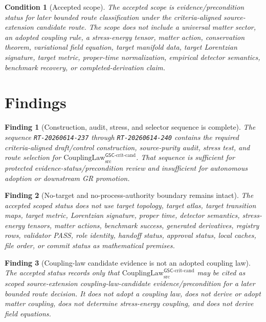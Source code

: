 \documentclass[11pt]{article}
\newcommand{\CouplingLawCrit}{\mathrm{CouplingLaw}^{\mathsf{GSC}\mbox{-}\mathrm{crit}\mbox{-}\mathrm{cand}}_{\mathrm{src}}}
\newtheorem{finding}{Finding}
\newtheorem{condition}{Condition}
\begin{document}
\begin{condition}[Accepted scope]
The accepted scope is evidence/precondition status for later bounded route
classification under the criteria-aligned source-extension candidate route.
The scope does not include a universal matter sector, an adopted coupling
rule, a stress-energy tensor, matter action, conservation theorem,
variational field equation, target manifold data, target Lorentzian
signature, target metric, proper-time normalization, empirical detector
semantics, benchmark recovery, or completed-derivation claim.
\end{condition}

\section{Findings}

\begin{finding}[Construction, audit, stress, and selector sequence is complete]
The sequence \texttt{RT-20260614-237} through \texttt{RT-20260614-240}
contains the required criteria-aligned draft/control construction,
source-purity audit, stress test, and route selection for
\(\CouplingLawCrit\). That sequence is sufficient for protected
evidence-status/precondition review and insufficient for autonomous adoption
or downstream GR promotion.
\end{finding}

\begin{finding}[No-target and no-process-authority boundary remains intact]
The accepted scoped status does not use target topology, target atlas, target
transition maps, target metric, Lorentzian signature, proper time, detector
semantics, stress-energy tensors, matter actions, benchmark success,
generated derivatives, registry rows, validator PASS, role identity, handoff
status, approval status, local caches, file order, or commit status as
mathematical premises.
\end{finding}

\begin{finding}[Coupling-law candidate evidence is not an adopted coupling law]
The accepted status records only that \(\CouplingLawCrit\) may be cited as
scoped source-extension coupling-law-candidate evidence/precondition for a
later bounded route decision. It does not adopt a coupling law, does not
derive or adopt matter coupling, does not determine stress-energy coupling,
and does not derive field equations.
\end{finding}
\end{document}
